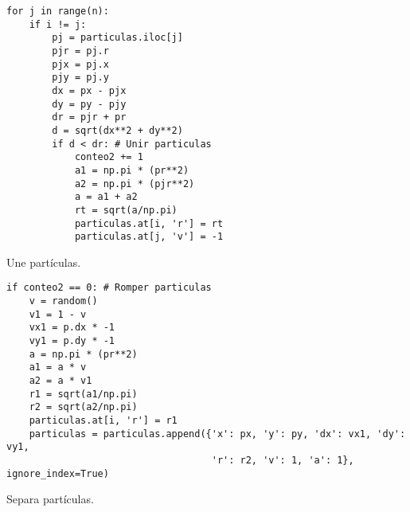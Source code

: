 \documentclass{article}
\begin{document}
\renewcommand{\listingscaption}{Código}
\begin{listing}[H]
  \begin{verbatim}
for j in range(n):
    if i != j:
        pj = particulas.iloc[j]
        pjr = pj.r
        pjx = pj.x
        pjy = pj.y
        dx = px - pjx
        dy = py - pjy
        dr = pjr + pr
        d = sqrt(dx**2 + dy**2)
        if d < dr: # Unir particulas
            conteo2 += 1
            a1 = np.pi * (pr**2)
            a2 = np.pi * (pjr**2)
            a = a1 + a2
            rt = sqrt(a/np.pi)
            particulas.at[i, 'r'] = rt
            particulas.at[j, 'v'] = -1
      \end{verbatim}
  \label{lst:fibo}
  \caption{Une partículas.}
\end{listing}

\renewcommand{\listingscaption}{Código}
\begin{listing}[H]
  \begin{verbatim}
if conteo2 == 0: # Romper particulas
    v = random()
    v1 = 1 - v
    vx1 = p.dx * -1
    vy1 = p.dy * -1
    a = np.pi * (pr**2)
    a1 = a * v
    a2 = a * v1
    r1 = sqrt(a1/np.pi)
    r2 = sqrt(a2/np.pi)
    particulas.at[i, 'r'] = r1
    particulas = particulas.append({'x': px, 'y': py, 'dx': vx1, 'dy': vy1, 
                                    'r': r2, 'v': 1, 'a': 1}, ignore_index=True)
      \end{verbatim}
  \label{lst:fibo}
  \caption{Separa partículas.}
\end{listing}



\printbibliography
\end{document}
